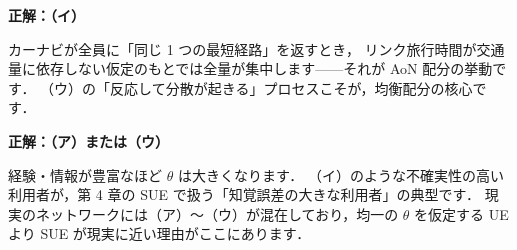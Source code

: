 \begin{example}[title={クイズ 2 正解・解説}]
\label{ans:q2}
\textbf{正解：（イ）}

カーナビが全員に「同じ 1 つの最短経路」を返すとき，
リンク旅行時間が交通量に依存しない仮定のもとでは全量が集中します——それが AoN 配分の挙動です．
（ウ）の「反応して分散が起きる」プロセスこそが，均衡配分の核心です．
\end{example}

\begin{example}[title={クイズ 3 正解・解説}]
\label{ans:q3}
\textbf{正解：（ア）または（ウ）}

経験・情報が豊富なほど $\theta$ は大きくなります．
（イ）のような不確実性の高い利用者が，第 4 章の SUE で扱う「知覚誤差の大きな利用者」の典型です．
現実のネットワークには（ア）〜（ウ）が混在しており，均一の $\theta$ を仮定する UE より
SUE が現実に近い理由がここにあります．
\end{example}
